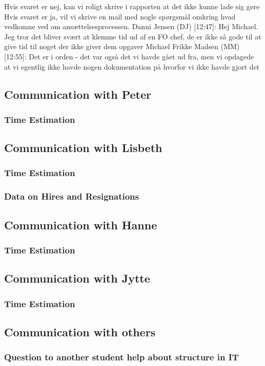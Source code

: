 Hvis svaret er nej, kan vi roligt skrive i rapporten at det ikke kunne lade sig gøre
Hvis svaret er ja, vil vi skrive en mail med nogle spørgsmål omkring hvad vedkomne ved om ansættelsesprocessen. \newline
Danni Jensen (DJ) [12:47]: 
Hej Michael. Jeg tror det bliver svært at klemme tid ud af en FO chef, de er ikke så gode til at give tid til noget der ikke giver dem opgaver \newline
Michael Frikke Madsen (MM) [12:55]: 
Det er i orden - det var også det vi havde gået ud fra, men vi opdagede at vi egentlig ikke havde nogen dokumentation på hvorfor vi ikke havde gjort det \newline


\subsection{Communication with Peter}

\subsubsection{Time Estimation}


\subsection{Communication with Lisbeth}

\subsubsection{Time Estimation}

\subsubsection{Data on Hires and Resignations}


\subsection{Communication with Hanne}

\subsubsection{Time Estimation}


\subsection{Communication with Jytte}

\subsubsection{Time Estimation}


\subsection{Communication with others}

\subsubsection{Question to another student help about structure in IT}
